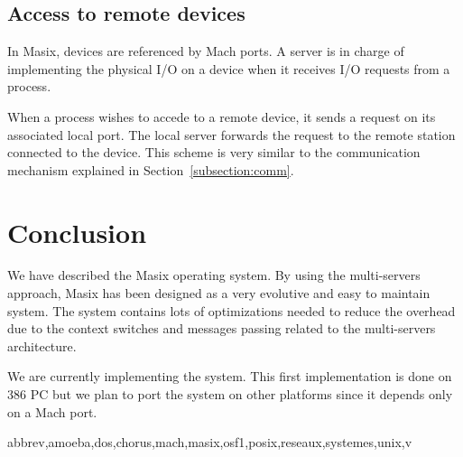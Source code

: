 \subsection {Access to remote devices}

	In Masix, devices are referenced by Mach ports. A server is in charge
of implementing the physical I/O on a device when it receives I/O requests
from a process.

	When a process wishes to accede to a remote device, it sends a request
on its associated local port. The local server forwards the request to the
remote station connected to the device. This scheme is very similar to the
communication mechanism explained in Section~\ref {subsection:comm}.

\section {Conclusion}

	We have described the Masix operating system. By using the
multi-servers approach, Masix has been designed as a very evolutive and easy
to maintain system. The system contains lots of optimizations needed to
reduce the overhead due to the context switches and messages passing related
to the multi-servers architecture.

	We are currently implementing the system. This first implementation
is done on 386 PC but we plan to port the system on other platforms since it
depends only on a Mach port.

	 {abbrev,amoeba,dos,chorus,mach,masix,osf1,posix,reseaux,systemes,unix,v}


